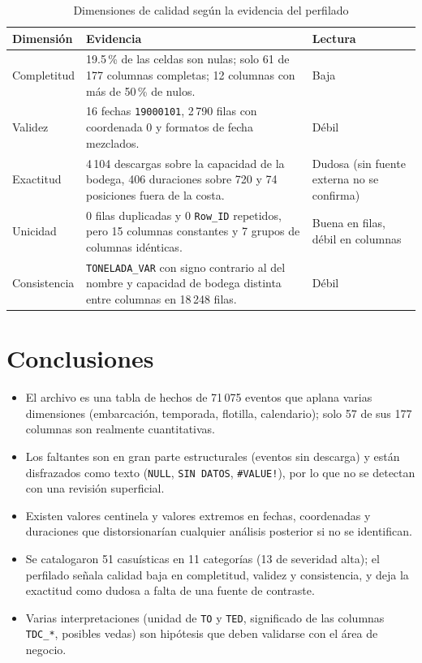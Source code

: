 \documentclass[11pt,a4paper]{article}
\begin{document}
\begin{table}[h!]
\centering
\caption{Dimensiones de calidad según la evidencia del perfilado}
\label{tab:dim}
\begin{tabular}{lp{8.3cm}p{2.8cm}}
\toprule
\textbf{Dimensión} & \textbf{Evidencia} & \textbf{Lectura} \\
\midrule
Completitud  & 19.5\,\% de las celdas son nulas; solo 61 de 177 columnas completas; 12 columnas con más de 50\,\% de nulos. & Baja \\
Validez      & 16 fechas \texttt{19000101}, 2\,790 filas con coordenada 0 y formatos de fecha mezclados. & Débil \\
Exactitud    & 4\,104 descargas sobre la capacidad de la bodega, 406 duraciones sobre 720 y 74 posiciones fuera de la costa. & Dudosa (sin fuente externa no se confirma) \\
Unicidad     & 0 filas duplicadas y 0 \texttt{Row\_ID} repetidos, pero 15 columnas constantes y 7 grupos de columnas idénticas. & Buena en filas, débil en columnas \\
Consistencia & \texttt{TONELADA\_VAR} con signo contrario al del nombre y capacidad de bodega distinta entre columnas en 18\,248 filas. & Débil \\
\bottomrule
\end{tabular}
\end{table}

\section{Conclusiones}

\begin{itemize}
  \item El archivo es una tabla de hechos de 71\,075 eventos que aplana varias dimensiones (embarcación, temporada, flotilla, calendario); solo 57 de sus 177 columnas son realmente cuantitativas.
  \item Los faltantes son en gran parte estructurales (eventos sin descarga) y están disfrazados como texto (\texttt{NULL}, \texttt{SIN DATOS}, \texttt{\#VALUE!}), por lo que no se detectan con una revisión superficial.
  \item Existen valores centinela y valores extremos en fechas, coordenadas y duraciones que distorsionarían cualquier análisis posterior si no se identifican.
  \item Se catalogaron 51 casuísticas en 11 categorías (13 de severidad alta); el perfilado señala calidad baja en completitud, validez y consistencia, y deja la exactitud como dudosa a falta de una fuente de contraste.
  \item Varias interpretaciones (unidad de \texttt{TO} y \texttt{TED}, significado de las columnas \texttt{TDC\_*}, posibles vedas) son hipótesis que deben validarse con el área de negocio.
\end{itemize}
\end{document}
